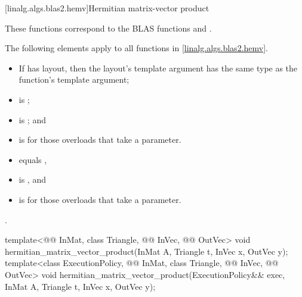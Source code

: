 [linalg.algs.blas2.hemv]{Hermitian matrix-vector product}

\pnum
\begin{note}
These functions correspond to the BLAS functions
 and \supercite{blas2}.
\end{note}

\pnum
The following elements apply to all functions in \ref{linalg.algs.blas2.hemv}.

\pnum
\mandates
\begin{itemize}
\item
If  has  layout,
then the layout's  template argument
has the same type as the function's  template argument;
\item
{}
is ;
\item
{}
is ; and
\item
{}
is  for those overloads that take a  parameter.
\end{itemize}

\pnum
\expects
\begin{itemize}
\item
{} equals ,
\item
{} is , and
\item
{} is  for those overloads that take a  parameter.
\end{itemize}

\pnum
\complexity
{}.

%
\begin{itemdecl}
template<@@ InMat, class Triangle, @@ InVec, @@ OutVec>
  void hermitian_matrix_vector_product(InMat A, Triangle t, InVec x, OutVec y);
template<class ExecutionPolicy,
         @@ InMat, class Triangle, @@ InVec, @@ OutVec>
  void hermitian_matrix_vector_product(ExecutionPolicy&& exec,
                                       InMat A, Triangle t, InVec x, OutVec y);
\end{itemdecl}

